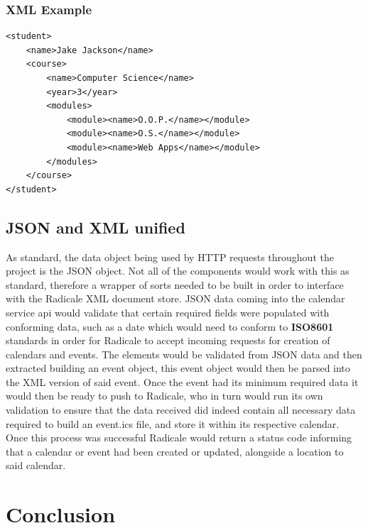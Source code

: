 \subsubsection{XML Example}
\begin{verbatim}
<student>
	<name>Jake Jackson</name>
	<course>
		<name>Computer Science</name>
		<year>3</year>
		<modules>
			<module><name>O.O.P.</name></module>
			<module><name>O.S.</name></module>
			<module><name>Web Apps</name></module>
		</modules>
	</course>
</student>
\end{verbatim}

\subsection{JSON and XML unified}
	As standard, the data object being used by HTTP requests throughout the project is the JSON object. Not all of the components would work with this as standard, therefore a wrapper of sorts needed to be built in order to interface with the Radicale XML document store. JSON data coming into the calendar service api would validate that certain required fields were populated with conforming data, such as a date which would need to conform to \textbf{ISO8601} standards in order for Radicale to accept incoming requests for creation of calendars and events. The elements would be validated from JSON data and then extracted building an event object, this event object would then be parsed into the XML version of said event. Once the event had its minimum required data it would then be ready to push to Radicale, who in turn would run its own validation to ensure that the data received did indeed contain all necessary data required to build an event.ics file, and store it within its respective calendar. Once this process was successful Radicale would return a status code informing that a calendar or event had been created or updated, alongside a location to said calendar. 


\section{Conclusion}
